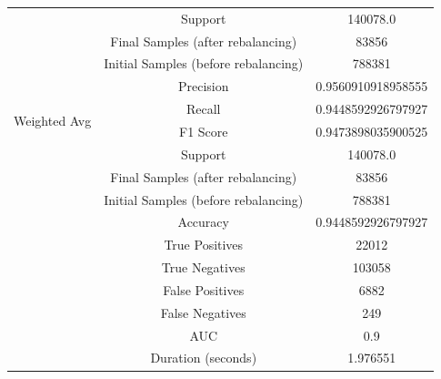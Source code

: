 \begin{longtable}{|c|c|c|}
 & Support & 140078.0 \\
 & Final Samples (after rebalancing) & 83856 \\
 & Initial Samples (before rebalancing) & 788381 \\
\hline
\multirow{4}{*}{Weighted Avg} & Precision & 0.9560910918958555 \\
 & Recall & 0.9448592926797927 \\
 & F1 Score & 0.9473898035900525 \\
 & Support & 140078.0 \\
 & Final Samples (after rebalancing) & 83856 \\
 & Initial Samples (before rebalancing) & 788381 \\
\hline
& Accuracy & 0.9448592926797927 \\ \hline
& True Positives & 22012 \\ \hline
& True Negatives & 103058 \\ \hline
& False Positives & 6882 \\ \hline
& False Negatives & 249 \\ \hline
& AUC & 0.9 \\ \hline
& Duration (seconds) & 1.976551 \\ \hline
\end{longtable}


